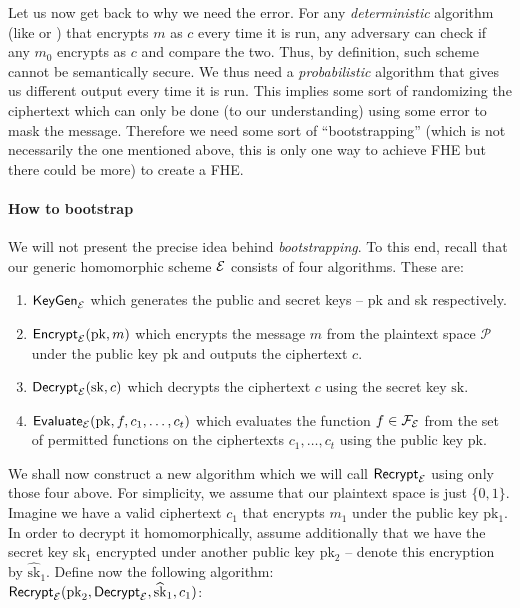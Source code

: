 Let us now get back to why we need the error. For any \textit{deterministic} algorithm (like  or ) that encrypts $m$ as $c$ every time it is run, any adversary can check if any $m_0$ encrypts as $c$ and compare the two. Thus, by definition, such scheme cannot be semantically secure. We thus need a \textit{probabilistic} algorithm that gives us different output every time it is run. This implies some sort of randomizing the ciphertext which can only be done (to our understanding) using some error to mask the message. Therefore we need some sort of ``bootstrapping'' (which is not necessarily the one mentioned above, this is only one way to achieve FHE but there could be more) to create a FHE.

\paragraph{How to bootstrap}
We will not present the precise idea behind \textit{bootstrapping}. To this end, recall that our generic homomorphic scheme $\mathcal{E}$ consists of four algorithms. These are:
\begin{enumerate}
	\item $\textsf{KeyGen}_{\mathcal{E}}$ which generates the public and secret keys -- pk and sk respectively.
	\item $\textsf{Encrypt}_{\mathcal{E}}(\text{pk}, m)$ which encrypts the message $m$ from the plaintext space $\mathcal{P}$ under the public key $\text{pk}$ and outputs the ciphertext $c$.
	\item $\textsf{Decrypt}_{\mathcal{E}}(\text{sk}, c)$ which decrypts the ciphertext $c$ using the secret key $\text{sk}$.
	\item $\textsf{Evaluate}_{\mathcal{E}}(\text{pk}, f, c_1, \ldots, c_t)$ which evaluates the function $f \in \mathcal{F}_{\mathcal{E}}$ from the set of permitted functions on the ciphertexts $c_1, \ldots, c_t$ using the public key pk.
\end{enumerate}
We shall now construct a new algorithm which we will call $\textsf{Recrypt}_{\mathcal{E}}$ using only those four above. For simplicity, we assume that our plaintext space is just $\{0,1\}$. Imagine we have a valid ciphertext $c_1$ that encrypts $m_1$ under the public key pk$_1$. In order to decrypt it homomorphically, assume additionally that we have the secret key sk$_1$ encrypted under another public key pk$_2$ -- denote this encryption by $\widehat{\text{sk}}_1$. Define now the following algorithm:\\
$\textsf{Recrypt}_{\mathcal{E}}(\text{pk}_2, \textsf{Decrypt}_{\mathcal{E}}, \widehat{\text{sk}}_1, c_1)$:


